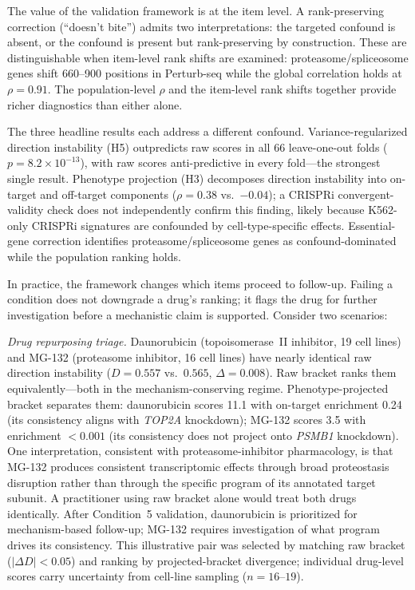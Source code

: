 \documentclass[11pt]{article}
\begin{document}
The value of the validation framework is at the item level. A
rank-preserving correction (``doesn't bite'') admits two interpretations:
the targeted confound is absent, or the confound is present but
rank-preserving by construction. These are distinguishable when item-level
rank shifts are examined: proteasome/spliceosome genes shift 660--900
positions in Perturb-seq while the global correlation holds at $\rho =
0.91$. The population-level $\rho$ and the item-level rank shifts together
provide richer diagnostics than either alone.

The three headline results each address a different confound.
Variance-regularized direction instability (H5) outpredicts raw scores in
all 66 leave-one-out folds ($p = 8.2 \times 10^{-13}$), with raw scores
anti-predictive in every fold---the strongest single result.
Phenotype projection (H3) decomposes direction instability into on-target
and off-target components ($\rho = 0.38$ vs.\ $-0.04$); a CRISPRi
convergent-validity check does not independently confirm this finding,
likely because K562-only CRISPRi signatures are confounded by
cell-type-specific effects. Essential-gene correction identifies
proteasome/spliceosome genes as confound-dominated while the population
ranking holds.

In practice, the framework changes which items proceed to follow-up.
Failing a condition does not downgrade a drug's ranking; it flags the drug
for further investigation before a mechanistic claim is supported.
Consider two scenarios:

\emph{Drug repurposing triage.} Daunorubicin (topoisomerase~II inhibitor,
19 cell lines) and MG-132 (proteasome inhibitor, 16 cell lines) have
nearly identical raw direction instability ($D = 0.557$ vs.\ $0.565$,
$\Delta = 0.008$). Raw bracket ranks them equivalently---both in the
mechanism-conserving regime. Phenotype-projected bracket separates them:
daunorubicin scores 11.1 with on-target enrichment 0.24 (its consistency
aligns with \emph{TOP2A} knockdown); MG-132 scores 3.5 with enrichment
$< 0.001$ (its consistency does not project onto \emph{PSMB1} knockdown).
One interpretation, consistent with proteasome-inhibitor pharmacology, is
that MG-132 produces consistent transcriptomic effects through broad
proteostasis disruption rather than through the specific program of its
annotated target subunit. A practitioner using raw bracket alone would
treat both drugs identically. After Condition~5 validation, daunorubicin is
prioritized for mechanism-based follow-up; MG-132 requires investigation
of what program drives its consistency. This illustrative pair was selected
by matching raw bracket ($|\Delta D| < 0.05$) and ranking by projected-bracket
divergence; individual drug-level scores carry uncertainty from cell-line
sampling ($n = 16$--$19$).
\end{document}
